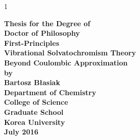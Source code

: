 \documentclass[b5paper,oneside,fleqn,11pt]{book}
\newenvironment{localspacing}[1]
      {\begin{spacing}{#1}}
      {\end{spacing}}
\begin{document}
\frontmatter
\graphicspath{{figures/}}
\begin{localspacing}{1}

     \thispagestyle{empty}
     \begin{center}
     \vspace*{0.0cm} %
     {\LARGE \bf{Thesis for the Degree of}}\\[0.2cm]
     {\LARGE \bf{Doctor of Philosophy} }\\
     \vfill
     {\LARGE \bf{First-Principles\\[0.2cm]
                 Vibrational Solvatochromism Theory\\[0.2cm]
                 Beyond Coulombic Approximation}} \\
     \vfill
     {\LARGE \bf{by}}\\[0.2cm]
     {\LARGE \bf{Bartosz B{\l}asiak}}\\
     \vfill
     {\LARGE \bf{Department of Chemistry}}\\[0.2cm]
     {\LARGE \bf{College of Science}}\\[0.2cm]
     {\LARGE \bf{Graduate School}}\\[0.2cm]
     {\LARGE \bf{Korea University}}\\
     \vfill
     {\Large \bf{July 2016}}\\
     \end{center}
     \clearpage


\end{localspacing}
\end{document}
